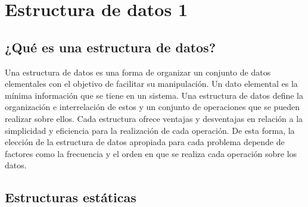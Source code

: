
\chapter{Estructura de datos 1}

\section{¿Qué es una estructura de datos?}

Una estructura de datos es una forma de organizar un conjunto de datos elementales con
el objetivo de facilitar su manipulación. Un dato elemental es la mínima información que
se tiene en un sistema.
Una estructura de datos define la organización e interrelación de estos y un conjunto de
operaciones que se pueden realizar sobre ellos.
Cada estructura ofrece ventajas y desventajas en relación a la simplicidad y eficiencia para
la realización de cada operación. De esta forma, la elección de la estructura de datos
apropiada para cada problema depende de factores como la frecuencia y el orden en que
se realiza cada operación sobre los datos.

\section{Estructuras estáticas
}